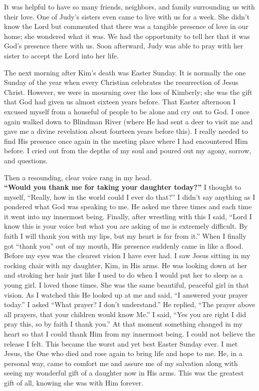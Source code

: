 \documentclass[twoside, 12pt]{book}
\begin{document}
It was helpful to have so many friends, neighbors, and family surrounding us with their love. One of Judy’s sisters even came to live with us for a week. She didn't know the Lord but commented that there was a tangible presence of love in our home; she wondered what it was. We had the opportunity to tell her that it was God’s presence there with us. Soon afterward, Judy was able to pray with her sister to accept the Lord into her life.

The next morning after Kim's death was Easter Sunday. It is normally the one Sunday of the year when every Christian celebrates the resurrection of Jesus Christ. However, we were in mourning over the loss of Kimberly; she was the gift that God had given us almost sixteen years before. That Easter afternoon I excused myself from a houseful of people to be alone and cry out to God. I once again walked down to Blindman River (where He had sent a deer to visit me and gave me a divine revelation about fourteen years before this). I really needed to find His presence once again in the meeting place where I had encountered Him before. I cried out from the depths of my soul and poured out my agony, sorrow, and questions.

Then a resounding, clear voice rang in my head. \\
\textbf{“Would you thank me for taking your daughter today?”} I thought to myself, “Really, how in the world could I ever do that?” I didn't say anything as I pondered what God was speaking to me. He asked me three times and each time it went into my innermost being. Finally, after wrestling with this I said, “Lord I know this is your voice but what you are asking of me is extremely difficult. By faith I will thank you with my lips, but my heart is far from it.” When I finally got “thank you” out of my mouth, His presence suddenly came in like a flood. Before my eyes was the clearest vision I have ever had. I saw Jesus sitting in my rocking chair with my daughter, Kim, in His arms. He was looking down at her and stroking her hair just like I used to do when I would put her to sleep as a young girl. I loved those times. She was the same beautiful, peaceful girl in that vision. As I watched this He looked up at me and said, “I answered your prayer today.” I asked “What prayer? I don't understand.” He replied, “The prayer above all prayers, that your children would know Me.” I said, “Yes you are right I did pray this, so by faith I thank you.” At that moment something changed in my heart so that I could thank Him from my innermost being. I could not believe the release I felt.  This became the worst and yet best Easter Sunday ever. I met Jesus, the One who died and rose again to bring life and hope to me. He, in a personal way, came to comfort me and assure me of my salvation along with seeing my wonderful gift of a daughter now in His arms. This was the greatest gift of all, knowing she was with Him forever.
\end{document}
